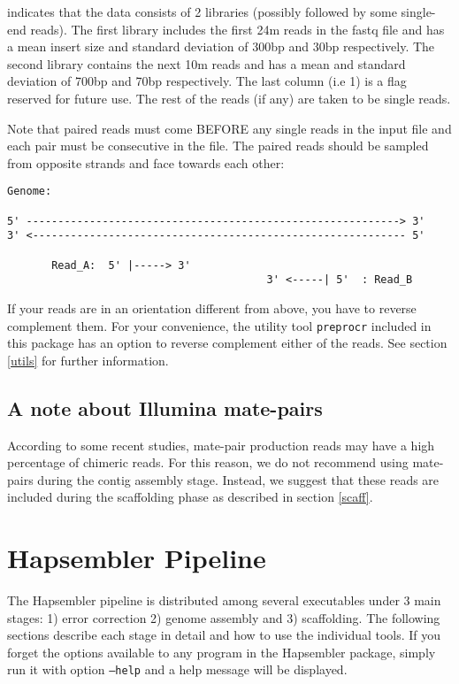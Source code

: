 \documentclass[12pt,a4paper]{report}
\begin{document}
indicates that the data consists of 2 libraries (possibly followed by some single-end reads). The first library includes the first 24m reads in the fastq file and has a mean insert size and standard deviation of 300bp and 30bp respectively. The second library contains the next 10m reads and has a mean and standard deviation of 700bp and 70bp respectively. The last column (i.e 1) is a flag reserved for future use. The rest of the reads (if any) are taken to be single reads. 

Note that paired reads must come BEFORE any single reads in the input file and each pair must be consecutive in the file. The paired reads should be sampled from opposite strands and face towards each other:

\begin{verbatim}
Genome:

5' -----------------------------------------------------------> 3'
3' <----------------------------------------------------------- 5'

       Read_A:  5' |-----> 3'
                                         3' <-----| 5'  : Read_B
\end{verbatim}

If your reads are in an orientation different from above, you have to reverse complement them. For your convenience, the utility tool \texttt{preprocr} included in this package has an option to reverse complement either of the reads. See section \ref{utils} for further information.

\subsection{A note about Illumina mate-pairs}

According to some recent studies, mate-pair production reads may have a high percentage of chimeric reads. For this reason, we do not recommend using mate-pairs during the contig assembly stage. Instead, we suggest that these reads are included during the scaffolding phase as described in section \ref{scaff}. 

\section{Hapsembler Pipeline}

The Hapsembler pipeline is distributed among several executables under 3 main stages: 1) error correction 2) genome assembly and 3) scaffolding. The following sections describe each stage in detail and how to use the individual tools. If you forget the options available to any program in the Hapsembler package, simply run it with option \texttt{--help} and a help message will be displayed.
\end{document}

